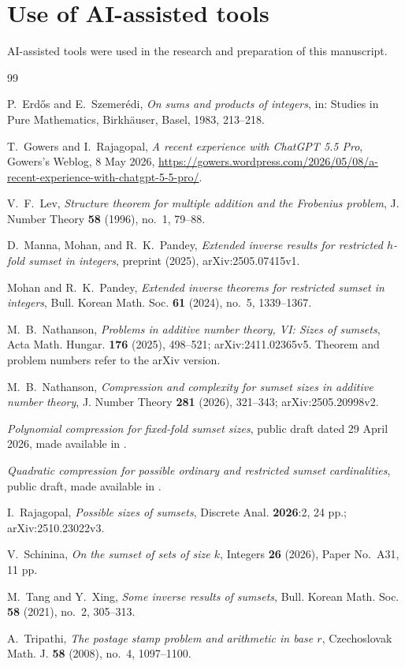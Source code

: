 \documentclass[11pt]{amsart}
\theoremstyle{definition}
\theoremstyle{remark}
\numberwithin{equation}{section}
\begin{document}
\section*{Use of AI-assisted tools}
AI-assisted tools were used in the research and preparation of this manuscript.

\begin{thebibliography}{99}

P.~Erd\H{o}s and E.~Szemer\'edi, \emph{On sums and products of integers}, in: Studies in Pure Mathematics, Birkh\"auser, Basel, 1983, 213--218.

T.~Gowers and I.~Rajagopal, \emph{A recent experience with ChatGPT 5.5 Pro}, Gowers's Weblog, 8 May 2026, \url{https://gowers.wordpress.com/2026/05/08/a-recent-experience-with-chatgpt-5-5-pro/}.

V.~F.~Lev, \emph{Structure theorem for multiple addition and the Frobenius problem}, J. Number Theory \textbf{58} (1996), no.~1, 79--88.

D.~Manna, Mohan, and R.~K.~Pandey, \emph{Extended inverse results for restricted $h$-fold sumset in integers}, preprint (2025), arXiv:2505.07415v1.

Mohan and R.~K.~Pandey, \emph{Extended inverse theorems for restricted sumset in integers}, Bull. Korean Math. Soc. \textbf{61} (2024), no.~5, 1339--1367.

M.~B.~Nathanson, \emph{Problems in additive number theory, VI: Sizes of sumsets}, Acta Math. Hungar. \textbf{176} (2025), 498--521; arXiv:2411.02365v5. Theorem and problem numbers refer to the arXiv version.

M.~B.~Nathanson, \emph{Compression and complexity for sumset sizes in additive number theory}, J. Number Theory \textbf{281} (2026), 321--343; arXiv:2505.20998v2.

\emph{Polynomial compression for fixed-fold sumset sizes}, public draft dated 29 April 2026, made available in \cite{GR26}.

\emph{Quadratic compression for possible ordinary and restricted sumset cardinalities}, public draft, made available in \cite{GR26}.

I.~Rajagopal, \emph{Possible sizes of sumsets}, Discrete Anal. \textbf{2026}:2, 24 pp.; arXiv:2510.23022v3.

V.~Schinina, \emph{On the sumset of sets of size $k$}, Integers \textbf{26} (2026), Paper No.~A31, 11 pp.

M.~Tang and Y.~Xing, \emph{Some inverse results of sumsets}, Bull. Korean Math. Soc. \textbf{58} (2021), no.~2, 305--313.

A.~Tripathi, \emph{The postage stamp problem and arithmetic in base $r$}, Czechoslovak Math. J. \textbf{58} (2008), no.~4, 1097--1100.

\end{thebibliography}
\end{document}

